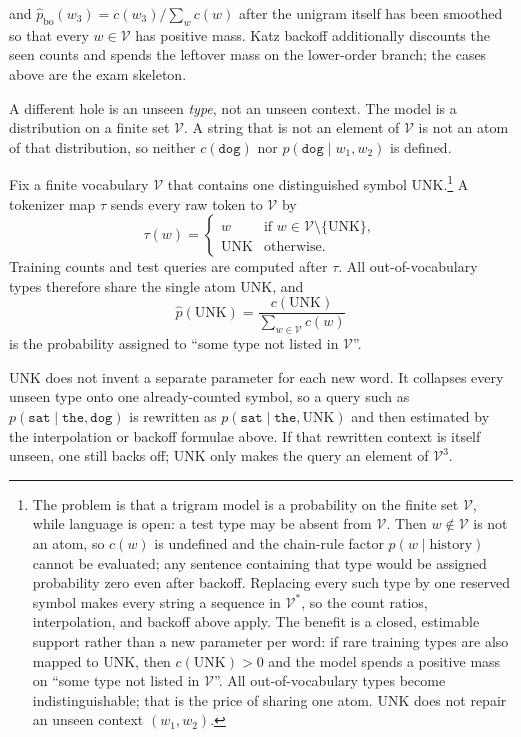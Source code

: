 \documentclass[11pt,a4paper]{article}
\theoremstyle{definition}
\begin{document}
and \(\widehat p_{\mathrm{bo}}(w_3)=c(w_3)/\sum_w c(w)\) after the unigram itself has been smoothed so that every \(w\in\mathcal{V}\) has positive mass. Katz backoff additionally discounts the seen counts and spends the leftover mass on the lower-order branch; the cases above are the exam skeleton.

A different hole is an unseen \emph{type}, not an unseen context. The model is a distribution on a finite set \(\mathcal{V}\). A string that is not an element of \(\mathcal{V}\) is not an atom of that distribution, so neither \(c(\texttt{dog})\) nor \(p(\texttt{dog}\mid w_1,w_2)\) is defined.

\begin{definition}\label{def:spr2025-nlp-unk}
Fix a finite vocabulary \(\mathcal{V}\) that contains one distinguished symbol \(\mathrm{UNK}\).\footnote{The problem is that a trigram model is a probability on the finite set \(\mathcal{V}\), while language is open: a test type may be absent from \(\mathcal{V}\). Then \(w\notin\mathcal{V}\) is not an atom, so \(c(w)\) is undefined and the chain-rule factor \(p(w\mid\text{history})\) cannot be evaluated; any sentence containing that type would be assigned probability zero even after backoff. Replacing every such type by one reserved symbol makes every string a sequence in \(\mathcal{V}^*\), so the count ratios, interpolation, and backoff above apply. The benefit is a closed, estimable support rather than a new parameter per word: if rare training types are also mapped to \(\mathrm{UNK}\), then \(c(\mathrm{UNK})>0\) and the model spends a positive mass on ``some type not listed in \(\mathcal{V}\)''. All out-of-vocabulary types become indistinguishable; that is the price of sharing one atom. \(\mathrm{UNK}\) does not repair an unseen context \((w_1,w_2)\).} A tokenizer map \(\tau\) sends every raw token to \(\mathcal{V}\) by
\[
\tau(w)
=
\begin{cases}
w & \text{if }w\in\mathcal{V}\setminus\{\mathrm{UNK}\},\\
\mathrm{UNK} & \text{otherwise}.
\end{cases}
\]
Training counts and test queries are computed after \(\tau\). All out-of-vocabulary types therefore share the single atom \(\mathrm{UNK}\), and
\[
\widehat p(\mathrm{UNK})
=\frac{c(\mathrm{UNK})}{\sum_{w\in\mathcal{V}}c(w)}
\]
is the probability assigned to ``some type not listed in \(\mathcal{V}\)''.
\end{definition}

UNK does not invent a separate parameter for each new word. It collapses every unseen type onto one already-counted symbol, so a query such as \(p(\texttt{sat}\mid\texttt{the},\texttt{dog})\) is rewritten as \(p(\texttt{sat}\mid\texttt{the},\mathrm{UNK})\) and then estimated by the interpolation or backoff formulae above. If that rewritten context is itself unseen, one still backs off; UNK only makes the query an element of \(\mathcal{V}^3\).
\end{document}
